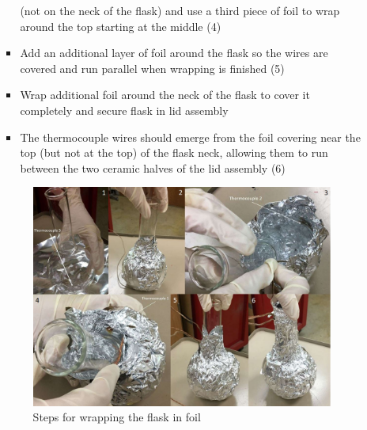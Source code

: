 \documentclass[letterpaper,11pt]{article}
\begin{document}
\begin{itemize}
\begin{itemize}
\begin{itemize}
                    (not on the neck of the flask) and use a third piece of foil
                     to wrap around the top starting at the middle (4)
                \item Add an additional layer of foil around  the flask so the 
                    wires are covered and run parallel when wrapping is finished
                    (5)
                \item Wrap additional foil around the neck of the flask to cover 
                    it completely and secure flask in lid assembly
                \item The thermocouple wires should emerge from the foil 
                    covering near the top (but not at the top) of the flask 
                    neck, allowing them to run between the two ceramic halves of
                    the lid assembly (6)
                \end{itemize}

\begin{figure}[H]
\centering
\includegraphics[width=1\textwidth]{wrap.jpg}
\caption{Steps for wrapping the flask in foil}
\label{fig:wrap}
\end{figure}


\end{itemize}
\end{itemize}
\end{document}
